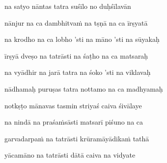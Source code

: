 na satyo nāntas tatra suśīlo no duḥśīlavān\thinspace{\dandab} \dontdisplaylinenum

nānjur na ca dambhitva\.m na tṣṇā na ca īrṣyatā \veg\dontdisplaylinenum

na krodho na ca lobho 'sti na māno 'sti na sūyakaḥ\thinspace{\dandab} \dontdisplaylinenum

īrṣyā dveṣo na tatrāsti na śaṭho na ca matsaraḥ \veg\dontdisplaylinenum

na vyādhir na jarā tatra na śoko 'sti na viklavaḥ\thinspace{\dandab} \dontdisplaylinenum

nādhamaḥ puruṣas tatra nottamo na ca madhyamaḥ \veg\dontdisplaylinenum

notkṣṭo mānavas tasmin striyaś caiva śivālaye\thinspace{\dandab} \dontdisplaylinenum

na nindā na praśa\.msāsti matsarī piśuno na ca \veg\dontdisplaylinenum

garvadarpa\.m na tatrāsti krūramāyādika\.m tathā\thinspace{\dandab} \dontdisplaylinenum

yācamāno na tatrāsti dātā caiva na vidyate \veg\dontdisplaylinenum

